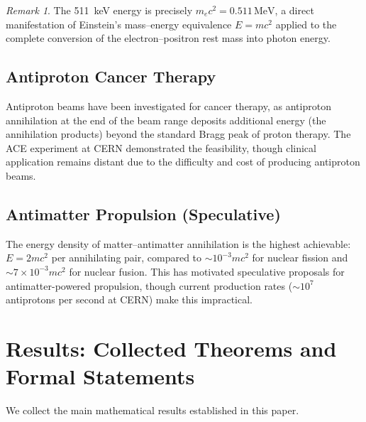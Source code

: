 \documentclass[12pt]{article}
\theoremstyle{definition}
\theoremstyle{remark}
\newtheorem{remark}[theorem]{Remark}
\newcommand{\MeV}{\,\text{MeV}}
\begin{document}
\begin{remark}
The 511~keV energy is precisely $m_e c^2 = 0.511\MeV$, a direct manifestation
of Einstein's mass--energy equivalence $E = mc^2$ applied to the complete conversion
of the electron--positron rest mass into photon energy.
\end{remark}

\subsection{Antiproton Cancer Therapy}

Antiproton beams have been investigated for cancer therapy, as antiproton annihilation
at the end of the beam range deposits additional energy (the annihilation products)
beyond the standard Bragg peak of proton therapy. The ACE experiment at CERN
demonstrated the feasibility, though clinical application remains distant due to
the difficulty and cost of producing antiproton beams.

\subsection{Antimatter Propulsion (Speculative)}

The energy density of matter--antimatter annihilation is the highest achievable:
$E = 2mc^2$ per annihilating pair, compared to $\sim 10^{-3} mc^2$ for nuclear fission
and $\sim 7 \times 10^{-3} mc^2$ for nuclear fusion. This has motivated speculative
proposals for antimatter-powered propulsion, though current production rates
($\sim 10^7$ antiprotons per second at CERN) make this impractical.

\section{Results: Collected Theorems and Formal Statements}
\label{sec:results}

We collect the main mathematical results established in this paper.
\end{document}
